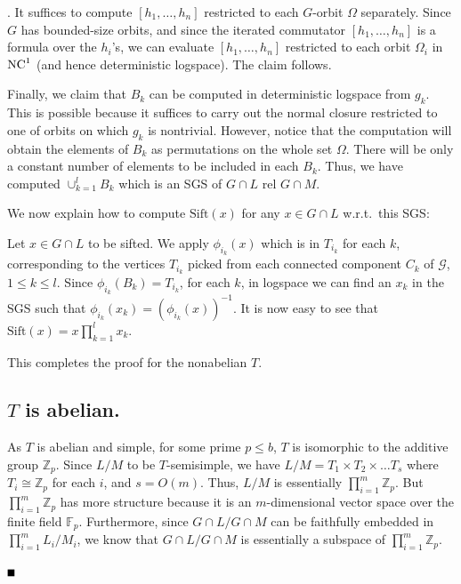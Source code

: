\documentclass[11pt]{article}
\newcommand{\bproof}{\noindent{\it Proof}}
\newcommand{\eproof}{\hspace*{\fill}$\rule{2mm}{2mm}$~~~~~\bigskip}
\renewenvironment{proof}{\bproof. }{\eproof}
\newcommand{\NC}{\mbox{\rm NC}}
\newcommand{\NCone}{\ensuremath{\NC^1}}
\newcommand{\Sift}[1]{\ensuremath{\mathrm{Sift}({#1})}}
\newcommand{\commu}[1]
{\ensuremath{\left\lbrack #1 \right\rbrack}}
\newcommand{\Z}{\mathbb{Z}}
\newcommand{\F}{\ensuremath{\mathbb{F}}}
\begin{document}
\begin{proof}
It suffices to compute $\commu{h_1,\ldots,h_n}$ restricted to each
$G$-orbit $\Omega$ separately. Since $G$ has bounded-size orbits, and
since the iterated commutator $\commu{h_1,\ldots,h_n}$ is a formula
over the $h_i$'s, we can evaluate $\commu{h_1,\ldots,h_n}$ restricted
to each orbit $\Omega_i$ in $\NCone$ (and hence deterministic
logspace). The claim follows.

Finally, we claim that $B_k$ can be computed in deterministic logspace
from $g_k$. This is possible because it suffices to carry out the
normal closure restricted to one of orbits on which $g_k$ is
nontrivial. However, notice that the computation will obtain the
elements of $B_k$ as permutations on the whole set $\Omega$. There
will be only a constant number of elements to be included in each
$B_k$. Thus, we have computed $\cup_{k=1}^l B_k$ which is an SGS of
$G\cap L$ rel $G\cap M$.

We now explain how to compute $\Sift{x}$ for any $x\in G\cap L$
w.r.t.\ this SGS:

Let $x\in G\cap L$ to be sifted. We apply $\phi_{i_k}(x)$ which is in
$T_{i_k}$ for each $k$, corresponding to the vertices $T_{i_k}$ picked
from each connected component $C_k$ of $\mathcal{G}$, $1\leq k\leq l$.
Since $\phi_{i_k}(B_k)=T_{i_k}$, for each $k$, in logspace we can find
an $x_k$ in the SGS such that
$\phi_{i_k}(x_k)=(\phi_{i_k}(x))^{-1}$. It is now easy to see that
$\Sift{x}=x\prod_{k=1}^lx_k$.

This completes the proof for the nonabelian $T$.
 
\subsection*{$T$ is abelian.}

As $T$ is abelian and simple, for some prime $p\leq b$, $T$ is
isomorphic to the additive group $\Z_p$. Since $L/M$ to be
$T$-semisimple, we have $L/M = T_1 \times T_2 \times \ldots T_s$ where
$T_i \cong \Z_p$ for each $i$, and $s=O(m)$. Thus, $L/M$ is
essentially $\prod_{i=1}^m \Z_p$. But $\prod_{i=1}^m \Z_p$ has more
structure because it is an $m$-dimensional vector space over the
finite field $\F_p$. Furthermore, since $G\cap L /G \cap M$ can be
faithfully embedded in $\prod_{i=1}^m L_i/M_i$, we know that $G\cap L
/G \cap M$ is essentially a subspace of $\prod_{i=1}^m \Z_p$.


\end{proof}
\end{document}
